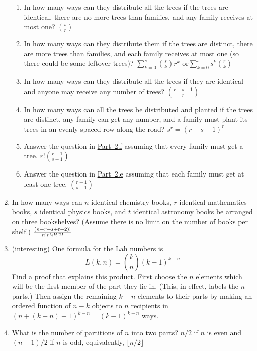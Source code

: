 \documentclass[10pt,]{book}
\theoremstyle{plain}
\theoremstyle{definition}
\numberwithin{equation}{chapter}
\begin{document}
\begin{enumerate}
\begin{enumerate}
%
\item\hypertarget{li-57}{}In how many ways can they distribute all the trees if the trees are identical, there are no more trees than families,   and any family receives at most one? \(s\choose r\)%
%
\item\hypertarget{li-58}{}In how many ways can they distribute them if the trees are distinct, there are more trees than families, and each family receives at most one (so there could be some leftover trees)? \(\sum_{k=0}^s {s\choose k}r^{\underline{k}}\) or\(\sum_{k=0}^s s^{\underline{k}}{r\choose k}\)%
%
\item\hypertarget{multisetproblem}{}In how many ways can they distribute all the trees if they are identical and anyone may receive any number of trees? \(r+s-1\choose r\)%
%
\item\hypertarget{orderedfunctionproblem}{}In how many ways can all the trees be distributed and planted if the trees are distinct, any family can get any number, and a family must plant its trees in an evenly spaced row along the road? \(s^{\overline{r}}=(r+s-1)^{\underline{r}}\)%
%
\item\hypertarget{li-61}{}Answer the question in \hyperlink{orderedfunctionproblem}{Part~2.f} assuming that every family must get a tree. \(r!{r-1\choose s-1}\)%
%
\item\hypertarget{li-62}{}Answer the question in \hyperlink{multisetproblem}{Part~2.e} assuming that each family must get at least one tree. \(r-1\choose s-1\)%
%
\end{enumerate}
%
\item\hypertarget{li-63}{}In how many ways can \(n\) identical chemistry books, \(r\) identical mathematics books, \(s\) identical physics books, and \(t\) identical astronomy books be arranged on three bookshelves? (Assume there is no limit on the number of books per shelf.) \({(n+r+s+t+2)! \over n!r!s!t!2!}\)%
%
\item\hypertarget{li-64}{}(interesting) One formula for the Lah numbers is%
\begin{equation*}
L(k,n) = {k\choose n}(k-1)^{\underline{k-n}}
\end{equation*}
Find a proof that explains this product. First choose the \(n\) elements which will be the first member of the part they lie in. (This, in effect, labels the \(n\) parts.) Then assign the remaining \(k-n\) elements to their parts by making an ordered function of \(n-k\) objects to \(n\) recipients in \((n + (k-n) - 1)^{{k-n}} = (k-1)^{{k-n}}\) ways.%
%
\item\hypertarget{li-65}{}What is the number of partitions of \(n\) into two parts? \(n/2\) if \(n\) is even and \((n-1)/2\) if \(n\) is odd, equivalently, \(\lfloor n/2\rfloor\)%

\end{enumerate}
\end{document}
